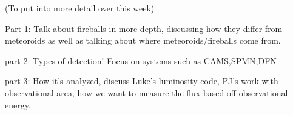 
(To put into more detail over this week)

Part 1: Talk about fireballs in more depth, discussing how they differ from meteoroids as well as talking about where meteoroids/fireballs come from.

part 2: Types of detection! Focus on systems such as CAMS,SPMN,DFN

part 3: How it's analyzed, discuss Luke's luminosity code, PJ's work with observational area, how we want to measure the flux based off observational energy.